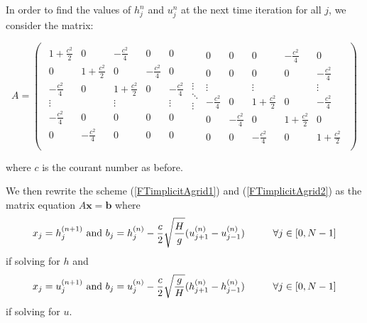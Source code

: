 \documentclass[a4paper,12pt, notitlepage]{article}
\newcommand\tab[1][0.05cm]{\hspace*{#1}}
\begin{document}
In order to find the values of $h_{j}^{n}$ and $u_{j}^{n}$ at the next time iteration for all $j$, we consider the matrix:

\[
A = \left (
\begin{array}{ccc}
\begin{array}{ccccc}
1 + \frac{c^{2}}{2} & 0 & -\frac{c^{2}}{4} & 0 & 0\\
0& 1 + \frac{c^{2}}{2} & 0 & -\frac{c^{2}}{4} & 0\\
-\frac{c^{2}}{4} & 0& 1 + \frac{c^{2}}{2} & 0 & -\frac{c^{2}}{4}\\
\vdots & & \vdots & & \vdots\\
- \frac{c^{2}}{4} & 0 & 0 & 0 & 0\\
0 & - \frac{c^{2}}{4} & 0 & 0 & 0\\
\end{array}
\begin{array}{c}
\vdots\\ 
\ddots\\
\vdots
\end{array}
\begin{array}{ccccc}
0 & 0 & 0 & - \frac{c^{2}}{4} & 0\\
0 & 0 & 0 & 0 & - \frac{c^{2}}{4}\\
\vdots & & \vdots & & \vdots\\
-\frac{c^{2}}{4}& 0 & 1 + \frac{c^{2}}{2} & 0 & -\frac{c^{2}}{4} \\
0 & -\frac{c^{2}}{4} & 0 & 1 + \frac{c^{2}}{2} & 0\\
0 & 0 & -\frac{c^{2}}{4}& 0 & 1 + \frac{c^{2}}{2}
\end{array}
\end{array}
\right )
\]

where $c$ is the courant number as before. 

We then rewrite the scheme (\ref{FTimplicitAgrid1}) and (\ref{FTimplicitAgrid2}) as the matrix equation $A \mathbf{x} = \mathbf{b}$ where 
\begin{equation}
x_{j} = h_{j}^{(n+1)} \text { and } b_{j} = h_{j}^{(n)} - \frac{c}{2}\sqrt{\frac{H}{g}}(u_{j+1}^{(n)} - u_{j-1}^{(n)}) \tab[1cm] \forall j \in [0, N-1]
\end{equation}
if solving for $h$ and
\begin{equation}
x_{j} = u_{j}^{(n+1)} \text { and } b_{j} = u_{j}^{(n)} - \frac{c}{2}\sqrt{\frac{g}{H}}(h_{j+1}^{(n)} - h_{j-1}^{(n)}) \tab[1cm] \forall j \in [0, N-1]
\end{equation}
if solving for $u$.
\end{document}
